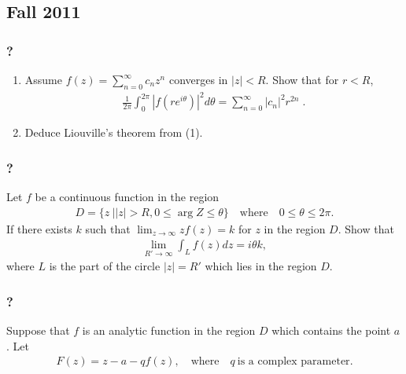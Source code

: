 \hypertarget{fall-2011}{%
\subsection{Fall 2011}\label{fall-2011}}

\hypertarget{section-102}{%
\subsubsection{?}\label{section-102}}

\begin{enumerate}
\def\labelenumi{(\arabic{enumi})}
\item
  Assume \(\displaystyle f(z) = \sum_{n=0}^\infty c_n z^n\) converges in
  \(|z| < R\). Show that for \(r <R\),
  \begin{align*}\frac{1}{2 \pi} \int_0^{2 \pi} |f(r e^{i \theta})|^2 d \theta =
  \sum_{n=0}^\infty |c_n|^2 r^{2n} \; .\end{align*}
\item
  Deduce Liouville's theorem from (1).
\end{enumerate}

\hypertarget{section-103}{%
\subsubsection{?}\label{section-103}}

Let \(f\) be a continuous function in the region
\begin{align*}D=\{z\ |  |z|>R, 0\leq \arg Z\leq \theta\}\quad\text{where}\quad
0\leq \theta \leq 2\pi.\end{align*}
If there exists \(k\) such that
\(\displaystyle{\lim_{z\to\infty} zf(z)=k}\) for \(z\) in the region
\(D\). Show that
\begin{align*}\lim_{R'\to\infty} \int_{L} f(z) dz=i\theta k,\end{align*}
where \(L\) is the part of the circle \(|z|=R'\) which lies in the
region \(D\).

\hypertarget{section-104}{%
\subsubsection{?}\label{section-104}}

Suppose that \(f\) is an analytic function in the region \(D\) which
contains the point \(a\). Let
\begin{align*}F(z)= z-a-qf(z),\quad \text{where}\quad q \ \text{is a complex
parameter}.\end{align*}

